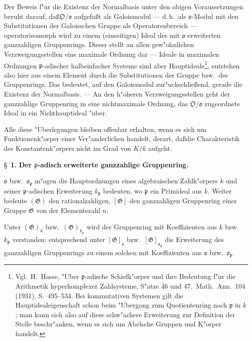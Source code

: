 \documentclass[12pt,a4paper]{article}
\theoremstyle{plain}
\begin{document}
Der Beweis f"ur die Existenz der Normalbasis unter den obigen Voraussetzungen beruht darauf, da\ss $\mathfrak{O}/\mathfrak{o}$ aufgefa\ss t als Galoismodul --- d.\,h.\ als $\mathfrak{o}$-Modul mit den Substitutionen der Galoisschen Gruppe als Operatorenbereich --- operatorisomorph wird zu einem (einseitigen) Ideal des mit $\mathfrak{o}$ erweiterten ganzzahligen Gruppenrings. Dieser stellt an allen gew"ohnlichen Verzweigungsstellen eine maximale Ordnung dar --- Ideale in maximalen Ordnungen $\mathfrak{p}$-adischer halbeinfacher Systeme sind aber Hauptideale\footnote{Vgl.\ H.\ Hasse, "Uber $\mathfrak{p}$-adische Schiefk"orper und ihre Bedeutung f"ur die Arithmetik hyperkomplexer Zahlsysteme, S"atze 46 und 47.\ Math.\ Ann.\ 104 (1931), S.\ 495--534. Bei kommutativen Systemen gilt die Hauptidealeigenschaft schon beim "Ubergang zum Quotientenring nach $\mathfrak{p}$ in $k$; man kann sich also auf diese schw"achere Erweiterung zur Definition der Stelle beschr"anken, wenn es sich um Abelsche Gruppen und K"orper handelt.}, entstehen also hier aus einem Element durch die Substitutionen der Gruppe bzw.\ des Gruppenrings. Das bedeutet, auf den Galoismodul zur"uckschlie\ss end, gerade die Existenz der Normalbasis. --- An den h"oheren Verzweigungsstellen geht der ganzzahlige Gruppenring in eine nichtmaximale Ordnung, das $\mathfrak{O}/\mathfrak{o}$ zugeordnete Ideal in ein Nichthauptideal "uber.

Alle diese "Uberlegungen bleiben offenbar erhalten, wenn es sich um Funktionenk"orper einer Ver"anderlichen handelt, derart, da\ss die Charakteristik des Konstantenk"orpers nicht im Grad von $K/k$ aufgeht.

\newpage
\S~\textbf{1.}
\textbf{Der $\mathfrak{p}$-adisch erweiterte ganzzahlige Gruppenring.}

\smallskip

$\mathfrak{o}$ bzw.\ $\mathfrak{o}_\mathfrak{p}$ m"ogen die Hauptordnungen eines algebraischen Zahlk"orpers $k$ und seiner $\mathfrak{p}$-adischen Erweiterung $k_\mathfrak{p}$ bedeuten, wo $\mathfrak{p}$ ein Primideal aus $k$. Weiter bedeute $(\mathfrak{G})$ den rationalzahligen, $[\mathfrak{G}]$ den ganzzahligen Gruppenring einer Gruppe $\mathfrak{G}$ von der Elementezahl $n$.

Unter $(\mathfrak{G})_k$ bzw.\ $(\mathfrak{G})_{k_\mathfrak{p}}$ wird der Gruppenring mit Koeffizienten aus $k$ bzw.\ $k_\mathfrak{p}$ verstanden; entsprechend unter $[\mathfrak{G}]_\mathfrak{o}$ bzw.\ $[\mathfrak{G}]_{\mathfrak{o}_\mathfrak{p}}$ die Erweiterung des ganzzahligen Gruppenrings zu einem solchen mit Koeffizienten aus $\mathfrak{o}$ bzw.\ $\mathfrak{o}_\mathfrak{p}$.
\end{document}

